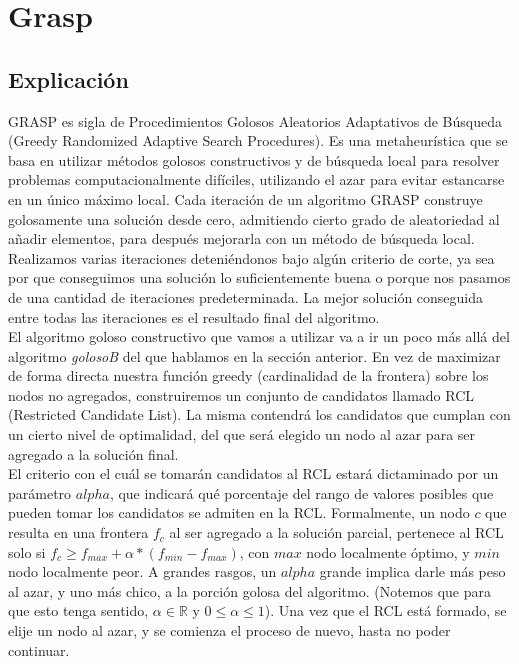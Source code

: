 \section{Grasp}

\subsection{Explicación}
GRASP es sigla de Procedimientos Golosos Aleatorios Adaptativos de Búsqueda (Greedy Randomized Adaptive Search Procedures). Es una metaheurística que se basa en utilizar métodos golosos constructivos y de búsqueda local para resolver problemas computacionalmente difíciles, utilizando el azar para evitar estancarse en un único máximo local. Cada iteración de un algoritmo GRASP construye golosamente una solución desde cero, admitiendo cierto grado de aleatoriedad al añadir elementos, para después mejorarla con un método de búsqueda local. Realizamos varias iteraciones deteniéndonos bajo algún criterio de corte, ya sea por que conseguimos una solución lo suficientemente buena o porque nos pasamos de una cantidad de iteraciones predeterminada. La mejor solución conseguida entre todas las iteraciones es el resultado final del algoritmo. \cite{paper_grasp} \\

El algoritmo goloso constructivo que vamos a utilizar va a ir un poco más allá del algoritmo \textit{golosoB} del que hablamos en la sección anterior. En vez de maximizar de forma directa nuestra función greedy (cardinalidad de la frontera) sobre los nodos no agregados, construiremos un conjunto de candidatos llamado RCL (Restricted Candidate List). La misma contendrá los candidatos que cumplan con un cierto nivel de optimalidad, del que será elegido un nodo al azar para ser agregado a la solución final. \\

El criterio con el cuál se tomarán candidatos al RCL estará dictaminado por un parámetro $alpha$, que indicará qué porcentaje del rango de valores posibles que pueden tomar los candidatos se admiten en la RCL. Formalmente, un nodo $c$ que resulta en una frontera $f_c$ al ser agregado a la solución parcial, pertenece al RCL solo si $f_c \geq f_{max} + \alpha * (f_{min} - f_{max})$, con $max$ nodo localmente óptimo, y $min$ nodo localmente peor. A grandes rasgos, un $alpha$ grande implica darle más peso al azar, y uno más chico, a la porción golosa del algoritmo. (Notemos que para que esto tenga sentido, $\alpha \in \mathbb{R}$ y $0 \leq \alpha \leq 1$). Una vez que el RCL está formado, se elije un nodo al azar, y se comienza el proceso de nuevo, hasta no poder continuar. \\


